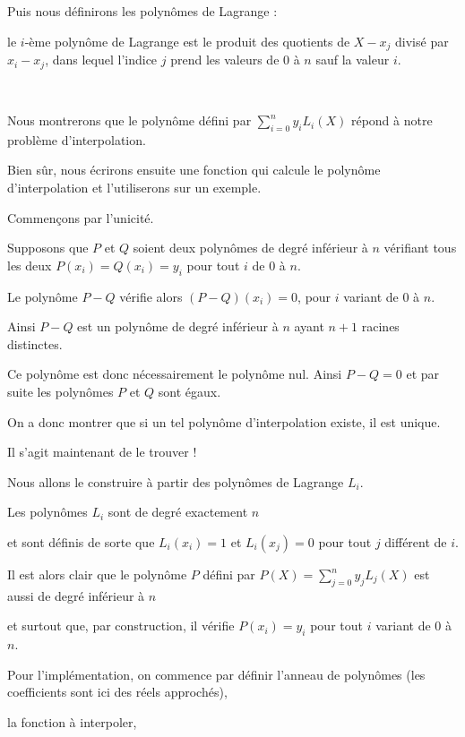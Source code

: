 \change
Puis nous définirons les polynômes de Lagrange :

le $i$-ème polynôme de Lagrange est le produit des quotients de  $X-x_j$ divisé par $x_i-x_j$, dans lequel l'indice $j$ prend les valeurs de $0$ à $n$ sauf la valeur $i$.

~

Nous montrerons que le polynôme défini par $\displaystyle \sum_{i=0}^{n} y_i L_i(X)$ répond à notre problème d'interpolation.

\change
Bien sûr, nous écrirons ensuite une fonction qui calcule le polynôme d'interpolation et l'utiliserons sur un exemple.

\diapo


Commençons par l'unicité.

Supposons que $P$ et $Q$ soient deux polynômes de degré inférieur à $n$ vérifiant
tous les deux $P(x_i)=Q(x_i)=y_i$ pour tout $i$ de $0$ à $n$.
  
\change  
Le polynôme $P-Q$ vérifie alors $(P-Q)(x_i)=0$, pour  $i$ variant de $0$ à $n$. 
 
\change 
Ainsi $P-Q$ est un polynôme de degré inférieur à $n$ ayant $n+1$ racines distinctes. 

\change
Ce polynôme est donc nécessairement le polynôme nul. Ainsi $P-Q=0$ et par suite les polynômes $P$ et $Q$ sont égaux.

On a donc montrer que si un tel polynôme d'interpolation existe, il est unique.

Il s'agit maintenant de le trouver !

\change
Nous allons le construire à partir des polynômes de Lagrange $L_i$.

\change
Les polynômes $L_i$ sont de degré exactement $n$ 

\change
et sont définis de sorte que $L_i(x_i) = 1$ et $L_i(x_j)=0$ pour tout  $j$ différent de $i$.
  
\change  
  Il est alors clair que le polynôme $P$ défini par $P(X) = \displaystyle \sum_{j=0}^{n} y_j L_j(X)$ est aussi de degré inférieur à $n$ 

\change   
et surtout que, par construction, il vérifie $P(x_i) = y_i$ pour tout $i$ variant de $0$ à $n$.
  
\change
Pour l'implémentation, on commence par définir l'anneau de polynômes (les coefficients sont ici des réels approchés),

\change
la fonction à interpoler,

